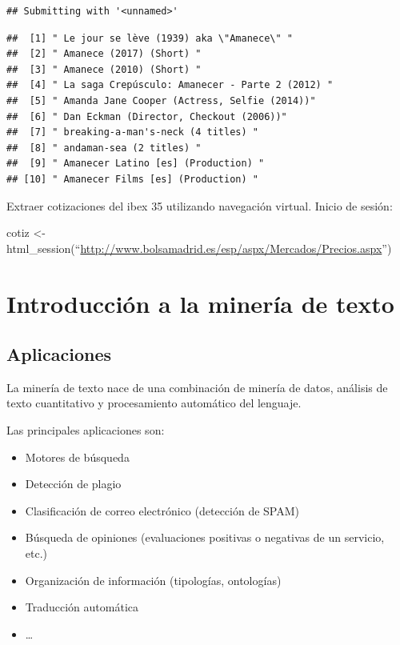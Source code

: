 \documentclass[]{article}
\newenvironment{Shaded}{\begin{snugshade}}{\end{snugshade}}
\providecommand{\tightlist}{%
  \setlength{\itemsep}{0pt}\setlength{\parskip}{0pt}}
\newenvironment{ej}{\begin{Shaded}}{\end{Shaded}}
\begin{document}
\begin{verbatim}
## Submitting with '<unnamed>'
\end{verbatim}

\begin{verbatim}
##  [1] " Le jour se lève (1939) aka \"Amanece\" "       
##  [2] " Amanece (2017) (Short) "                       
##  [3] " Amanece (2010) (Short) "                       
##  [4] " La saga Crepúsculo: Amanecer - Parte 2 (2012) "
##  [5] " Amanda Jane Cooper (Actress, Selfie (2014))"   
##  [6] " Dan Eckman (Director, Checkout (2006))"        
##  [7] " breaking-a-man's-neck (4 titles) "             
##  [8] " andaman-sea (2 titles) "                       
##  [9] " Amanecer Latino [es] (Production) "            
## [10] " Amanecer Films [es] (Production) "
\end{verbatim}

\begin{ej}
Extraer cotizaciones del ibex 35 utilizando navegación virtual. Inicio
de sesión:

cotiz \textless{}-
html\_session(``\url{http://www.bolsamadrid.es/esp/aspx/Mercados/Precios.aspx}'')
\end{ej}

\section{Introducción a la minería de
texto}\label{introduccion-a-la-mineria-de-texto}

\subsection{Aplicaciones}\label{aplicaciones}

La minería de texto nace de una combinación de minería de datos,
análisis de texto cuantitativo y procesamiento automático del lenguaje.

Las principales aplicaciones son:

\begin{itemize}
\tightlist
\item
  Motores de búsqueda
\item
  Detección de plagio
\item
  Clasificación de correo electrónico (detección de SPAM)
\item
  Búsqueda de opiniones (evaluaciones positivas o negativas de un
  servicio, etc.)
\item
  Organización de información (tipologías, ontologías)
\item
  Traducción automática
\item
  \ldots{}
\end{itemize}
\end{document}
